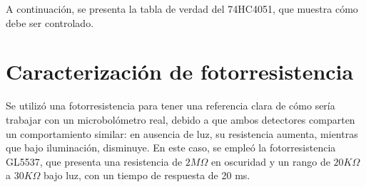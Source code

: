 A continuación, se presenta la tabla de verdad del 74HC4051, que muestra cómo debe ser controlado.
            \begin{table}[htbp]
                \caption{Tabla de verdad de multiplexor 74HC4051.}
                \begin{center}
                \label{tab:true_table_mux}
                \end{center}
            \end{table}


\section{Caracterización de fotorresistencia}
Se utilizó una fotorresistencia para tener una referencia clara de cómo sería trabajar con un microbolómetro real, debido a que ambos detectores comparten un comportamiento similar: en ausencia de luz, su resistencia aumenta, mientras que bajo iluminación, disminuye. En este caso, se empleó la fotorresistencia GL5537, que presenta una resistencia de $2M\Omega$ en oscuridad y un rango de $20K\Omega$ a $30K\Omega$ bajo luz, con un tiempo de respuesta de 20 ms.

